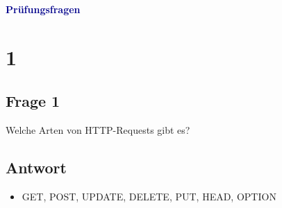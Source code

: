 \textbf{\textcolor{darkblue}{ Prüfungsfragen}}~

\section*{1}
\subsection*{Frage 1}
Welche Arten von HTTP-Requests gibt es?
\subsection*{Antwort}
\begin{itemize}
	\item GET, POST, UPDATE, DELETE, PUT, HEAD, OPTION
\end{itemize}
